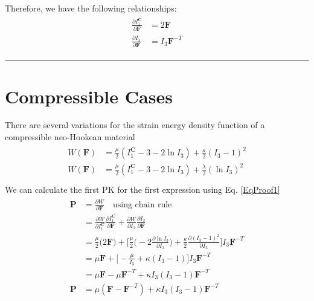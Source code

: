 \documentclass[12pt,3p]{article}
\numberwithin{equation}{section}
\begin{document}
Therefore, we have the following relationships: 
\begin{align}\label{EqProof1}
\begin{split}
\frac{\partial I_1^{\mathbf{C}}}{\partial \mathbf{F}} &= 2 \mathbf{F} \\
\frac{\partial I_3}{\partial \mathbf{F}} &= I_3 \mathbf{F}^{-T}
\end{split}
\end{align}
\noindent\rule{19cm}{0.5pt} %

\section{Compressible Cases}
There are several variations for the strain energy density function of a compressible neo-Hookean material 
\begin{align}\label{EqComp}
\begin{split}
W(\mathbf{F}) &= \frac{\mu}{2} (I_1^{\mathbf{C}} - 3 - 2 \ln I_3) + \frac{\kappa}{2} (I_3 - 1)^2 \\
W(\mathbf{F}) &= \frac{\mu}{2} (I_1^{\mathbf{C}} - 3 - 2 \ln I_3) + \frac{\lambda}{2} (\ln I_3)^2 \\
\end{split}
\end{align}
We can calculate the first PK for the first expression using Eq. \ref{EqProof1}
\begin{align}
\begin{split}
\mathbf{P} &= \frac{\partial W}{\partial \mathbf{F}} \quad \text{using chain rule} \\
		&= \frac{\partial W}{\partial I_1^\mathbf{C}} \frac{\partial I_1^\mathbf{C}}{\partial \mathbf{F}} + \frac{\partial W}{\partial I_3} \frac{\partial I_3}{\partial \mathbf{F}} \\
		&= \frac{\mu}{2} \big( 2 \mathbf{F} \big) + \bigg[ \frac{\mu}{2} \big( -2 \frac{\partial \ln I_3}{\partial I_3}\big) + \frac{\kappa}{2} \frac{\partial (I_3 - 1)^2}{\partial I_3}\bigg] I_3 \mathbf{F}^{-T} \\
		&= \mu \mathbf{F} + \bigg[ - \frac{\mu}{I_3} + \kappa (I_3 - 1) \bigg] I_3 \mathbf{F}^{-T} \\
		&=  \mu \mathbf{F} - \mu \mathbf{F}^{-T} + \kappa I_3 (I_3 - 1) \mathbf{F}^{-T} \\
\mathbf{P} &= \mu ( \mathbf{F} - \mathbf{F}^{-T}) + \kappa I_3 (I_3 - 1) \mathbf{F}^{-T} 
\end{split}
\end{align}
\end{document}
